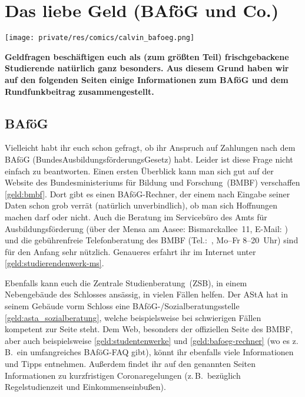 \section{Das liebe Geld (BAföG und Co.)}

\begin{center}
	\vspace{-0.6cm}
	\texttt{[image: private/res/comics/calvin\_bafoeg.png]}
\end{center}

\begin{multicols*}{2}
\textbf{Geldfragen beschäftigen euch als (zum größten Teil) frischgebackene Studierende natürlich ganz besonders.
Aus diesem Grund haben wir auf den folgenden Seiten einige Informationen zum BAföG und dem Rundfunkbeitrag zusammengestellt.}

\subsection{BAföG}
Vielleicht habt ihr euch schon gefragt, ob ihr Anspruch auf Zahlungen nach dem BAföG (BundesAusbildungsförderungsGesetz) habt.
Leider ist diese Frage nicht einfach zu beantworten.
Einen ersten Überblick kann man sich gut auf der Website des Bundesministeriums für Bildung und Forschung~(BMBF) verschaffen \cref{geld:bmbf}.
Dort gibt es einen BAföG-Rechner, der einem nach Eingabe seiner Daten schon grob verrät (natürlich unverbindlich), ob man sich Hoffnungen machen darf oder nicht.
Auch die Beratung im Servicebüro des Amts für Ausbildungsförderung (über der Mensa am Aasee: Bismarckallee~11, E-Mail: ) und die gebührenfreie Telefonberatung des BMBF (Tel.:~, Mo–Fr 8–20~Uhr) sind für den Anfang sehr nützlich.
Genaueres erfahrt ihr im Internet unter \cref{geld:studierendenwerk-ms}.

Ebenfalls kann euch die Zentrale Studienberatung~(ZSB), in einem Nebengebäude des Schlosses ansässig, in vielen Fällen helfen.
Der AStA hat in seinem Gebäude vorm Schloss eine BAföG-/Sozial\-beratungsstelle \cref{geld:asta_sozialberatung}, welche beispielsweise bei schwierigen Fällen kompetent zur Seite steht.
Dem Web, besonders der offiziellen Seite des BMBF, aber auch beispielsweise \cref{geld:studentenwerke} und \cref{geld:bafoeg-rechner} (wo es z.\,B.\ ein umfangreiches BAföG-FAQ gibt), könnt ihr ebenfalls viele Informationen und Tipps entnehmen.
Außerdem findet ihr auf den genannten Seiten Informationen zu kurzfristigen Coronaregelungen (z.\,B.\ bezüglich Regelstudienzeit und Einkommenseinbußen).


\end{multicols*}
